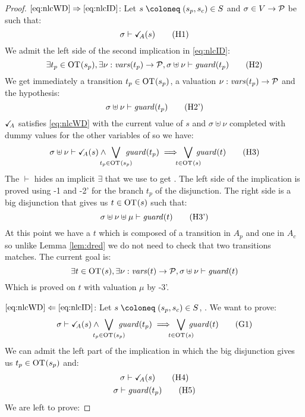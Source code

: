 \documentclass{article}
\begin{document}
\begin{proof}
\item[\(\eqref{eq:nlcWD}\Rightarrow\eqref{eq:nlcID}\):]
	Let \(s \defobject \mpar{s_p, s_c} \in S\) and \(\sigma \in V \to \mathcal{P}\) be such that:
	\[ \sigma \vdash \reach{A}\mpar{s} \hyp{1} \]
	We admit the left side of the second implication in \eqref{eq:nlcID}:
	\[ \exists t_p \in \fOT{s_p}, \exists \nu: \fvars{t_p} \to \values, \sigma \uplus \nu \vdash \fguard{t_p} \hyp{2} \]
	We get immediately a transition \(t_p \in \mathrm{OT}_{}{\left(s_p\right)}\), a valuation \(\nu: \mathit{vars}{\left(t_p\right)} \to \mathcal{P}\) and the hypothesis:
	\[ \sigma \uplus \nu \vdash \fguard{t_p} \hyp{2'} \]
	\(\checkmark_{\!\! A}\) satisfies \eqref{eq:nlcWD} with the current value of \(s\) and \(\sigma \uplus \nu\) completed with dummy values for the other variables of  so we have:
	\[ \sigma \uplus \nu \vdash \reach{A}\mpar{s} \wedge \bigvee_\subbox{t_p \in \fOT{s_p}} \fguard{t_p} \implies \bigvee_\subbox{t \in \fOT{s}} \fguard{t} \hyp{3} \]
	The \(\vdash\) hides an implicit \(\exists\) that we use to get .
	The left side of the implication is proved using \hyp{1} and \hyp{2'} for the branch \(t_p\) of the disjunction.
	The right side is a big disjunction that gives us \(t \in \mathrm{OT}_{}{\left(s\right)}\) such that:
	\[ \sigma \uplus \nu \uplus \mu \vdash \fguard{t} \hyp{3'} \]
	At this point we have a \(t\) which is composed of a transition in \(A_p\) and one in \(A_c\) so unlike Lemma \ref{lem:dred} we do not need to check that two transitions matches.
	The current goal is:
	\[ \exists t \in \mathrm{OT}_{}{\left(s\right)}, \exists \nu: \mathit{vars}{\left(t\right)} \to \mathcal{P}, \sigma \uplus \nu \vdash \mathit{guard}{\left(t\right)} \]
	Which is proved on \(t\) with valuation \(\mu\) by \hyp{3'}.
\item[\(\eqref{eq:nlcWD}\Leftarrow\eqref{eq:nlcID}\):]
	Let \(s \defobject \mpar{s_p, s_c} \in S\), .
	We want to prove:
	\[ \sigma \vdash \reach{A}\mpar{s} \wedge \bigvee_\subbox{t_p \in \fOT{s_p}} \fguard{t_p} \implies \bigvee_\subbox{t \in \fOT{s}} \fguard{t} \goal{1} \]
	We can admit the left part of the implication in which the big disjunction gives us \(t_p \in \mathrm{OT}_{}{\left(s_p\right)}\) and:\\
	\begin{gather}
		\sigma \vdash \reach{A}\mpar{s} \hyp{4} \\
		\sigma \vdash \fguard{t_p} \hyp{5}
	\end{gather}
	We are left to prove:

\end{proof}
\end{document}
